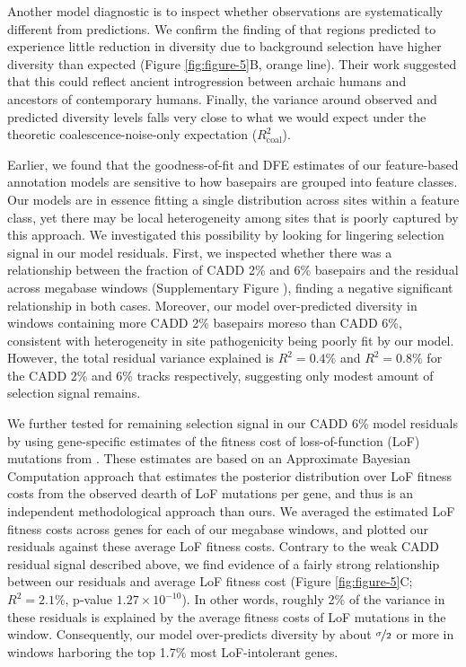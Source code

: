 \documentclass[11pt]{article}
\begin{document}
Another model diagnostic is to inspect whether observations are systematically
different from predictions. We confirm the finding of \textcite{Murphy2022-sj}
that regions predicted to experience little reduction in diversity due to
background selection have higher diversity than expected (Figure
\ref{fig:figure-5}B, orange line). Their work suggested that this could reflect
ancient introgression between archaic humans and ancestors of contemporary
humans. Finally, the variance around observed and predicted diversity levels
falls very close to what we would expect under the theoretic
coalescence-noise-only expectation ($R_\text{coal}^2$).

Earlier, we found that the goodness-of-fit and DFE estimates of our
feature-based annotation models are sensitive to how basepairs are grouped into
feature classes. Our models are in essence fitting a single distribution across
sites within a feature class, yet there may be local heterogeneity among sites
that is poorly captured by this approach. We investigated this possibility by
looking for lingering selection signal in our model residuals. First, we
inspected whether there was a relationship between the fraction of CADD 2\% and
6\% basepairs and the residual across megabase windows (Supplementary Figure
\label{suppfig:resid-cadd}), finding a negative significant relationship in
both cases. Moreover, our model over-predicted diversity in windows containing
more CADD 2\% basepairs moreso than CADD 6\%, consistent with heterogeneity in
site pathogenicity being poorly fit by our model. However, the total residual
variance explained is $R^2 = 0.4\%$ and $R^2 = 0.8\%$ for the CADD 2\% and 6\%
tracks respectively, suggesting only modest amount of selection signal remains.

We further tested for remaining selection signal in our CADD 6\% model
residuals by using gene-specific estimates of the fitness cost of
loss-of-function (LoF) mutations from \textcite{Agarwal2023-un}. These
estimates are based on an Approximate Bayesian Computation approach that
estimates the posterior distribution over LoF fitness costs from the observed
dearth of LoF mutations per gene, and thus is an independent methodological
approach than ours. We averaged the estimated LoF fitness costs across genes
for each of our megabase windows, and plotted our residuals against these
average LoF fitness costs. Contrary to the weak CADD residual signal described
above, we find evidence of a fairly strong relationship between our residuals
and average LoF fitness cost (Figure \ref{fig:figure-5}C; $R^2 = 2.1\%$,
p-value $1.27 \times 10^{-10}$). In other words, roughly 2\% of the variance in
these residuals is explained by the average fitness costs of LoF mutations in
the window. Consequently, our model over-predicts diversity by about
$\nicefrac{\sigma}{2}$ or more in windows harboring the top 1.7\% most
LoF-intolerant genes.
\end{document}
